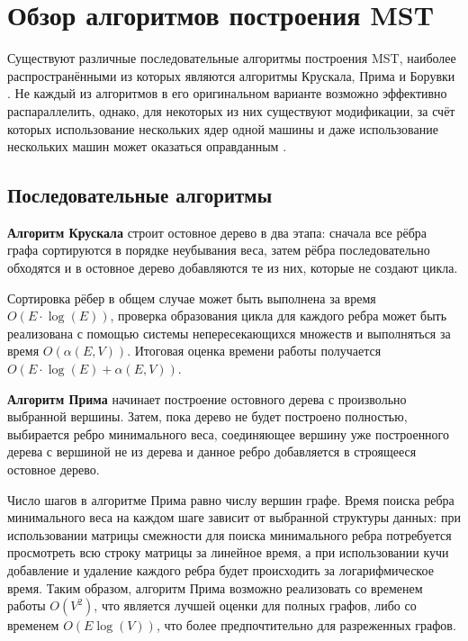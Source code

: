 \documentclass{article}
\begin{document}
\section{Обзор алгоритмов построения MST}
Существуют различные последовательные алгоритмы построения MST, наиболее распространёнными из которых являются алгоритмы Крускала, Прима и Борувки \cite{cormen}.
Не каждый из алгоритмов в его оригинальном варианте возможно эффективно распараллелить, однако, для некоторых из них существуют модификации, за счёт которых использование нескольких ядер одной машины и даже использование нескольких машин может оказаться оправданным \cite{boruvka-prima,kruskal-parallel}.

\subsection{Последовательные алгоритмы}

\textbf{Алгоритм Крускала} строит остовное дерево в два этапа: сначала все рёбра графа сортируются в порядке неубывания веса, затем рёбра последовательно обходятся и в остовное дерево добавляются те из них, которые не создают цикла.

Сортировка рёбер в общем случае может быть выполнена за время $O(E \cdot \log(E))$, проверка образования цикла для каждого ребра может быть реализована с помощью системы непересекающихся множеств и выполняться за время $O(\alpha(E, V))$. Итоговая оценка времени работы получается $O(E \cdot \log(E) + \alpha(E, V))$.


\textbf{Алгоритм Прима} начинает построение остовного дерева с произвольно выбранной вершины. Затем, пока дерево не будет построено полностью, выбирается ребро минимального веса, соединяющее вершину уже построенного дерева с вершиной не из дерева и данное ребро добавляется в строящееся остовное дерево.

Число шагов в алгоритме Прима равно числу вершин графе. Время поиска ребра минимального веса на каждом шаге зависит от выбранной структуры данных: при использовании матрицы смежности для поиска минимального ребра потребуется просмотреть всю строку матрицы за линейное время, а при использовании кучи добавление и удаление каждого ребра будет происходить за логарифмическое время. Таким образом, алгоритм Прима возможно реализовать со временем работы $O(V^2)$, что является лучшей оценки для полных графов, либо со временем $O(E \log (V))$, что более предпочтительно для разреженных графов.
\end{document}
